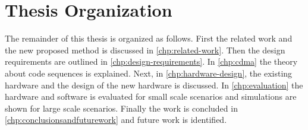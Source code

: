 
\section{Thesis Organization}

The remainder of this thesis is organized as follows.
First the related work and the new proposed method is discussed in \autoref{chp:related-work}.
Then the design requirements are outlined in \autoref{chp:design-requirements}.
In \autoref{chp:cdma} the theory about code sequences is explained.
Next, in \autoref{chp:hardware-design}, the existing hardware and the design of the new hardware is discussed.
In \autoref{chp:evaluation} the hardware and software is evaluated for small scale scenarios and simulations are shown for large scale scenarios.
Finally the work is concluded in \autoref{chp:conclusionsandfuturework} and future work is identified.